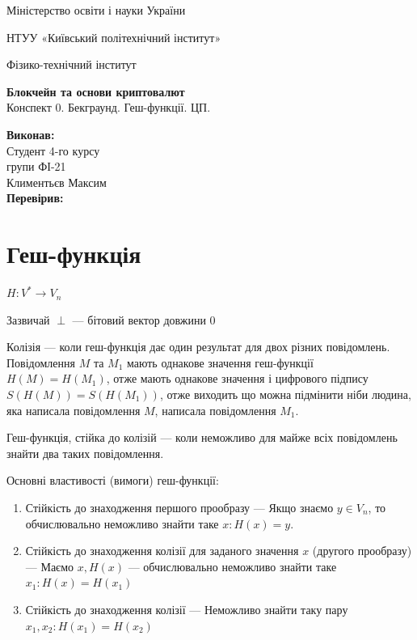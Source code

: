 \documentclass{article}
\begin{document}
    \begin{titlepage}
        \begin{center}

        Міністерство освіти і науки України
        
        НТУУ «Київський політехнічний інститут»
        
        Фізико-технічний інститут
        \vspace{3.3cm}
        
        {\textbf{Блокчейн та основи криптовалют}\\Конспект 0. Бекграунд. Геш-функції. ЦП.}

        \vspace{8.5cm}

        \begin{flushright}
            \textbf{Виконав:}\\Студент 4-го курсу\\групи ФІ-21\\Климентьєв Максим\\
            \textbf{Перевірив:}\\\text{\_\_\_\_\_\_\_\_\_\_\_\_\_\_\_\_\_\_}
        \end{flushright}

        \end{center}
    \end{titlepage}
    \newpage

    \tableofcontents
    \cleardoublepage
    \setcounter{page}{3}

    \newpage
    \section{Геш-функція}
        $ H: V^* \longrightarrow V_n $

        Зазвичай $ \perp $ --- бітовий вектор довжини 0

        Колізія --- коли геш-функція дає один результат для двох різних повідомлень. Повідомлення $M$ та $M_1$ мають однакове значення геш-функції $H(M) = H(M_1)$, отже мають однакове значення і цифрового підпису $ S(H(M)) = S(H(M_1)) $, отже виходить що можна підмінити ніби людина, яка написала повідомлення $M$, написала повідомлення $M_1$.

        Геш-функція, стійка до колізій --- коли неможливо для майже всіх повідомлень знайти два таких повідомлення.

        Основні властивості (вимоги) геш-функції:
        \begin{enumerate}
            \item Стійкість до знаходження першого прообразу --- Якщо знаємо $ y \in V_n $, то обчислювально неможливо знайти таке $x: H(x) = y$.
            \item Стійкість до знаходження колізії для заданого значення $x$ (другого прообразу) --- Маємо $x, H(x)$ --- обчислювально неможливо знайти таке $x_1: H(x) = H(x_1)$
            \item Стійкість до знаходження колізії --- Неможливо знайти таку пару $x_1, x_2: H(x_1) = H(x_2)$
        \end{enumerate}
\end{document}
